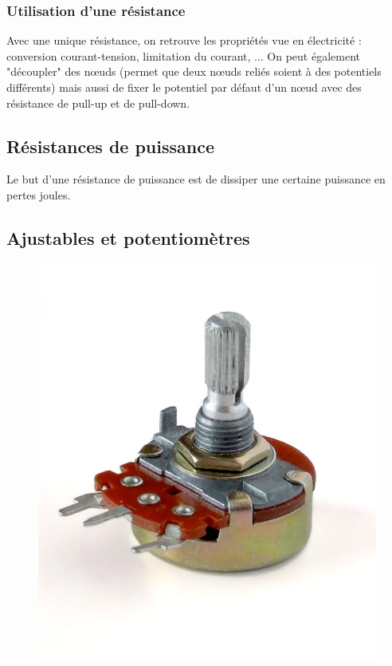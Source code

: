 \documentclass	[11pt, a4paper, openany]{book}
\begin{document}
\subsubsection{Utilisation d'une résistance}
Avec une unique résistance, on retrouve les propriétés vue en électricité : conversion courant-tension, limitation du courant,  ... On peut également "découpler" des nœuds (permet que deux nœuds reliés soient à des potentiels différents) mais aussi de fixer le potentiel par défaut d'un nœud avec des résistance de pull-up et de pull-down.


\subsection{Résistances de puissance}
Le but d'une résistance de puissance est de dissiper une certaine puissance en pertes joules.

\subsection{Ajustables et potentiomètres}
\begin{figure}
\includegraphics[scale=0.1]{img/image31}
\end{figure}
\end{document}
